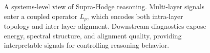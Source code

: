 {\begin{figure}[t]
\caption{
A systems-level view of Supra-Hodge reasoning. Multi-layer signals enter a coupled operator $L_p$, which encodes both intra-layer topology and inter-layer alignment. Downstream diagnostics expose energy, spectral structure, and alignment quality, providing interpretable signals for controlling reasoning behavior.
}
\label{fig:pipeline}
\end{figure}
}
